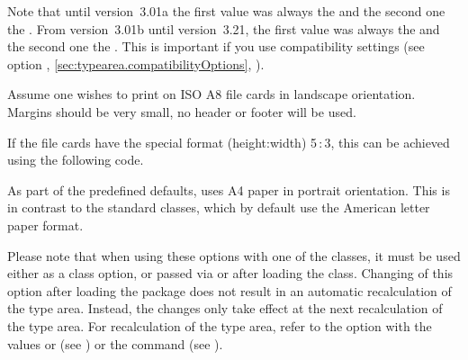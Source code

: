 Note that until version~3.01a the first value was always
the  and the second one the . From version~3.01b
until version~3.21, the first value was always the  and the
second one the . This is important if you use compatibility
settings (see option
%
,
\autoref{sec:typearea.compatibilityOptions},
).

\begin{Example}
 Assume one wishes to print on ISO A8 file cards in landscape
 orientation. Margins should be very small, no header or footer
 will be used.
If the file cards have the special format (height:width)
5\,:\,3, this can be achieved using the following
code.
\end{Example}

As part of the predefined defaults, {\KOMAScript} uses A4 paper in
portrait orientation. This is in contrast to the standard classes,
which by default use the American letter paper format.

Please note that when using these options with one of the {\KOMAScript}
classes, it must be used either as a class option, or passed via
 or 
after loading the class. Changing of this option after loading the
 package does not result in an automatic recalculation of
the type area. Instead, the changes only take effect at the next recalculation
of the type area. For recalculation of the type area, refer to the
 option with the values  or
 (see ) or the
 command (see
).%
%
\EndIndexGroup


